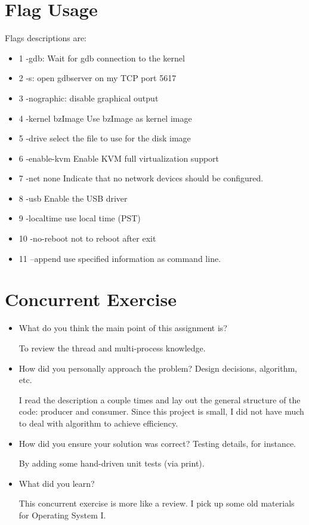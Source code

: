 \documentclass[letterpaper,10pt,titlepage]{article}
\begin{document}
\section{Flag Usage}
    Flags descriptions are:
    \begin{itemize}
        \item 1 -gdb: Wait for gdb connection to the kernel
        \item 2 -s: open gdbserver on my TCP port 5617
        \item 3 -nographic: disable graphical output
        \item 4 -kernel bzImage Use bzImage as kernel image
        \item 5 -drive select the file to use for the disk image
        \item 6 -enable-kvm Enable KVM full virtualization support
        \item 7 -net none Indicate that no network devices should be configured. 
        \item 8 -usb Enable the USB driver 
        \item 9 -localtime use local time (PST)
        \item 10 -no-reboot not to reboot after exit
        \item 11 --append use specified information as command line.
        
    \end{itemize}
    
    
\section{Concurrent Exercise}
\begin{itemize}

    \item  What do you think the main point of this assignment is?
    
    To review the thread and multi-process knowledge.
    
    \item How did you personally approach the problem? Design decisions, algorithm, etc.
    
    I read the description a couple times and lay out the general structure of the code: producer and consumer. Since this project is small, I did not have much to deal with algorithm to achieve efficiency.
    
    
    \item How did you ensure your solution was correct? Testing details, for instance.
    
    By adding some hand-driven unit tests (via print).
    
    
    \item What did you learn?

    This concurrent exercise is more like a review. I pick up some old materials for Operating System I.  
    
    
\end{itemize}
\end{document}
